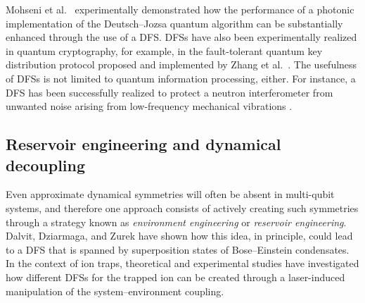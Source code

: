 \documentclass[3p,sort&compress]{elsarticle}
\begin{document}
Mohseni et al.\ \cite{Mohseni:2003:pp} experimentally demonstrated how the performance of a photonic implementation of the Deutsch--Jozsa quantum algorithm \cite{Deutsch:1989:mm} can be substantially enhanced through the use of a DFS. DFSs have also been experimentally realized in quantum cryptography, for example, in the fault-tolerant quantum key distribution protocol proposed and implemented by Zhang et al.\ \cite{Zhang:2006:zz}. The usefulness of DFSs is not limited to quantum information processing, either. For instance, a DFS has been successfully realized to protect a neutron interferometer from unwanted noise arising from low-frequency mechanical vibrations \cite{Pushin:2011:zz}. 
 
\subsection{\label{sec:reserv-engin-quant}Reservoir engineering and dynamical decoupling}

Even approximate dynamical symmetries will often be absent in multi-qubit systems, and therefore one approach consists of actively creating such symmetries through a strategy known as \emph{environment engineering} or \emph{reservoir engineering}. Dalvit, Dziarmaga, and Zurek \cite{Dalvit:2000:bb} have shown how this idea, in principle, could lead to a DFS that is spanned by superposition states of Bose--Einstein condensates. In the context of ion traps, theoretical \cite{Poyatos:1996:um} and experimental \cite{Myatt:2000:yy,Turchette:2000:aa,Carvalho:2001:ua} studies have investigated how different DFSs for the trapped ion can be created through a laser-induced manipulation of the system--environment coupling. 
\end{document}
